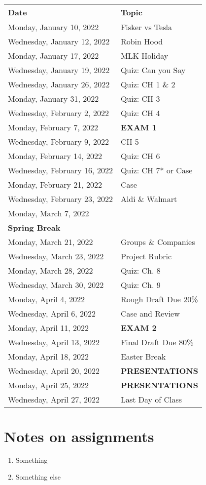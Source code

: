 \documentclass[
]{book}
\providecommand{\tightlist}{%
  \setlength{\itemsep}{0pt}\setlength{\parskip}{0pt}}
\begin{document}
\begin{longtable}[]{@{}ll@{}}
\toprule
Date & Topic \\
\midrule
\endhead
Monday, January 10, 2022 & Fisker vs Tesla \\
Wednesday, January 12, 2022 & Robin Hood \\
Monday, January 17, 2022 & MLK Holiday \\
Wednesday, January 19, 2022 & Quiz: Can you Say \\
Wednesday, January 26, 2022 & Quiz: CH 1 \& 2 \\
Monday, January 31, 2022 & Quiz: CH 3 \\
Wednesday, February 2, 2022 & Quiz: CH 4 \\
Monday, February 7, 2022 & \textbf{EXAM 1} \\
Wednesday, February 9, 2022 & CH 5 \\
Monday, February 14, 2022 & Quiz: CH 6 \\
Wednesday, February 16, 2022 & Quiz: CH 7* or Case \\
Monday, February 21, 2022 & Case \\
Wednesday, February 23, 2022 & Aldi \& Walmart \\
Monday, March 7, 2022 & \\
\textbf{Spring Break} & \\
Monday, March 21, 2022 & Groups \& Companies \\
Wednesday, March 23, 2022 & Project Rubric \\
Monday, March 28, 2022 & Quiz: Ch. 8 \\
Wednesday, March 30, 2022 & Quiz: Ch. 9 \\
Monday, April 4, 2022 & Rough Draft Due 20\% \\
Wednesday, April 6, 2022 & Case and Review \\
Monday, April 11, 2022 & \textbf{EXAM 2} \\
Wednesday, April 13, 2022 & Final Draft Due 80\% \\
Monday, April 18, 2022 & Easter Break \\
Wednesday, April 20, 2022 & \textbf{PRESENTATIONS} \\
Monday, April 25, 2022 & \textbf{PRESENTATIONS} \\
Wednesday, April 27, 2022 & Last Day of Class \\
\bottomrule
\end{longtable}

\hypertarget{notes-on-assignments}{%
\chapter{Notes on assignments}\label{notes-on-assignments}}

\begin{enumerate}
\def\labelenumi{\arabic{enumi}.}
\tightlist
\item
  Something
\item
  Something else
\end{enumerate}

  
\end{document}
